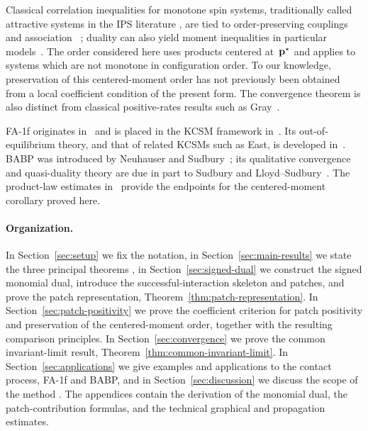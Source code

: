 Classical correlation inequalities for monotone spin systems, traditionally
called attractive systems in the IPS literature , are tied to order-preserving
couplings and association ~\cite{Harris1977,Liggett2006}; duality can also yield
moment inequalities in particular models~\cite{GiardinaRedigVafayi2010}. The
order considered here uses products centered at~$\mathbf{p}^\star$ and applies to
systems which are not monotone in configuration order. To our knowledge,
preservation of this centered-moment order has not previously been obtained
from a local coefficient condition of the present form. The convergence
theorem is also distinct from classical positive-rates results such as
Gray~\cite{Gray1982}.

FA-1f originates in~\cite{FredricksonAndersen1984} and is placed in the KCSM
framework in~\cite{CancriniEtAl2008,HartarskyToninelli2025}. Its
out-of-equilibrium theory, and that of related KCSMs such as East, is developed
in~\cite{CancriniEtAl2010,BlondelEtAl2013,MountfordValle2019,Mareche2019,
HartarskyToninelli2024}. BABP was introduced by Neuhauser and
Sudbury~\cite{NeuhauserSudbury1993}; its qualitative convergence and
quasi-duality theory are due in part to Sudbury and
Lloyd--Sudbury~\cite{Sudbury1997,LloydSudbury1997}. The product-law estimates
in~\cite{MartinelliShapiraToninelli2025} provide the endpoints for the
centered-moment corollary proved here.

\paragraph{Organization.} 
In Section~\ref{sec:setup} we fix the notation, in
Section~\ref{sec:main-results} we state the three principal theorems , in
Section~\ref{sec:signed-dual} we construct the signed monomial dual, introduce
the successful-interaction skeleton  and patches, and prove the patch
representation, Theorem~\ref{thm:patch-representation}.
In Section~\ref{sec:patch-positivity} we prove the coefficient criterion for patch
positivity and preservation of the centered-moment order, together with the
resulting comparison principles.
In Section~\ref{sec:convergence} we prove the common invariant-limit result,
Theorem~\ref{thm:common-invariant-limit}. In
Section~\ref{sec:applications} we give examples and applications to the contact
process, FA-1f and BABP, and in Section~\ref{sec:discussion} we discuss the scope of
the method . The appendices contain the derivation of the monomial dual, the
patch-contribution formulas, and the technical graphical and propagation
estimates.